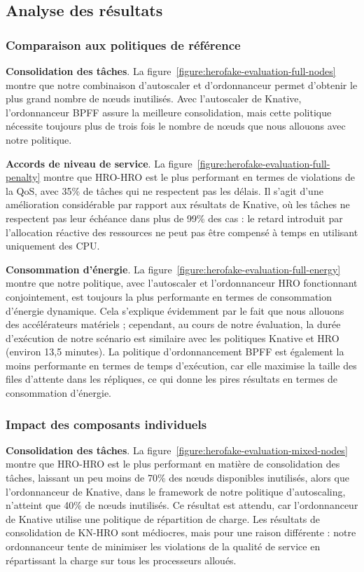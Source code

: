 \subsection{Analyse des résultats}

\subsubsection{Comparaison aux politiques de référence}

\textbf{Consolidation des tâches}. La figure~\ref{figure:herofake-evaluation-full-nodes} montre que notre combinaison d'autoscaler et d'ordonnanceur permet d'obtenir le plus grand nombre de nœuds inutilisés. Avec l'autoscaler de Knative, l'ordonnanceur BPFF assure la meilleure consolidation, mais cette politique nécessite toujours plus de trois fois le nombre de nœuds que nous allouons avec notre politique.

\textbf{Accords de niveau de service}. La figure~\ref{figure:herofake-evaluation-full-penalty} montre que HRO-HRO est le plus performant en termes de violations de la QoS, avec 35\% de tâches qui ne respectent pas les délais. Il s'agit d'une amélioration considérable par rapport aux résultats de Knative, où les tâches ne respectent pas leur échéance dans plus de 99\% des cas : le retard introduit par l'allocation réactive des ressources ne peut pas être compensé à temps en utilisant uniquement des CPU.

\textbf{Consommation d'énergie}. La figure~\ref{figure:herofake-evaluation-full-energy} montre que notre politique, avec l'autoscaler et l'ordonnanceur HRO fonctionnant conjointement, est toujours la plus performante en termes de consommation d'énergie dynamique. Cela s'explique évidemment par le fait que nous allouons des accélérateurs matériels ; cependant, au cours de notre évaluation, la durée d'exécution de notre scénario est similaire avec les politiques Knative et HRO (environ 13,5 minutes). La politique d'ordonnancement BPFF est également la moins performante en termes de temps d'exécution, car elle maximise la taille des files d'attente dans les répliques, ce qui donne les pires résultats en termes de consommation d'énergie.

\subsubsection{Impact des composants individuels}

\textbf{Consolidation des tâches}. La figure~\ref{figure:herofake-evaluation-mixed-nodes} montre que HRO-HRO est le plus performant en matière de consolidation des tâches, laissant un peu moins de 70\% des nœuds disponibles inutilisés, alors que l'ordonnanceur de Knative, dans le framework de notre politique d'autoscaling, n'atteint que 40\% de nœuds inutilisés. Ce résultat est attendu, car l'ordonnanceur de Knative utilise une politique de répartition de charge. Les résultats de consolidation de KN-HRO sont médiocres, mais pour une raison différente : notre ordonnanceur tente de minimiser les violations de la qualité de service en répartissant la charge sur tous les processeurs alloués.

